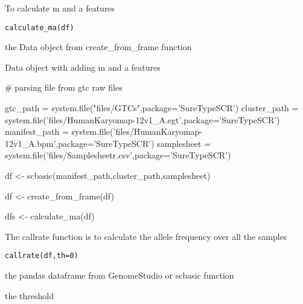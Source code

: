 \documentclass[a4paper]{book}
\begin{document}
%
\begin{Description}\relax
To calculate m and a features
\end{Description}
%
\begin{Usage}
\begin{verbatim}
calculate_ma(df)
\end{verbatim}
\end{Usage}
%
\begin{Arguments}
\begin{ldescription}
\item[\code{df}] the Data object from create\_from\_frame function
\end{ldescription}
\end{Arguments}
%
\begin{Value}
Data object with adding m and a features
\end{Value}
%
\begin{Examples}
\begin{ExampleCode}

# parsing file from gtc raw files

gtc_path = system.file("files/GTCs",package='SureTypeSCR')
cluster_path = system.file('files/HumanKaryomap-12v1_A.egt',package='SureTypeSCR')
manifest_path = system.file('files/HumanKaryomap-12v1_A.bpm',package='SureTypeSCR')
samplesheet = system.file('files/Samplesheetr.csv',package='SureTypeSCR')

df <- scbasic(manifest_path,cluster_path,samplesheet)

df <- create_from_frame(df)

dfs <- calculate_ma(df)




\end{ExampleCode}
\end{Examples}
%
\begin{Description}\relax
The callrate function is to calculate the allele frequency over all the samples
\end{Description}
%
\begin{Usage}
\begin{verbatim}
callrate(df,th=0)
\end{verbatim}
\end{Usage}
%
\begin{Arguments}
\begin{ldescription}
\item[\code{df}] the pandas dataframe from GenomeStudio or scbasic function
\item[\code{th}] the threshold
\end{ldescription}
\end{Arguments}
\end{document}
